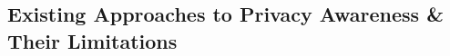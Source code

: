 \documentclass[acmlarge, nonacm]{acmart}
\begin{document}

\subsection{Existing Approaches to Privacy Awareness \& Their Limitations}
\end{document}
